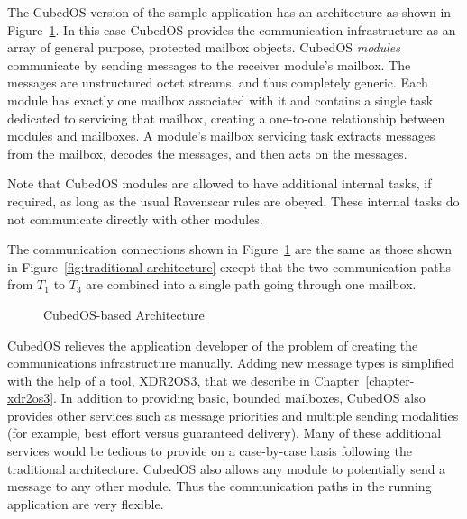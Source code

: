 The CubedOS version of the sample application has an architecture as shown in
Figure~\ref{fig:cubedos-architecture}. In this case CubedOS provides the communication
infrastructure as an array of general purpose, protected mailbox objects. CubedOS
\textit{modules} communicate by sending messages to the receiver module's mailbox. The messages
are unstructured octet streams, and thus completely generic. Each module has exactly one mailbox
associated with it and contains a single task dedicated to servicing that mailbox, creating a
one-to-one relationship between modules and mailboxes. A module's mailbox servicing task
extracts messages from the mailbox, decodes the messages, and then acts on the messages.

Note that CubedOS modules are allowed to have additional internal tasks, if required, as long as
the usual Ravenscar rules are obeyed. These internal tasks do not communicate directly with
other modules.

The communication connections shown in Figure~\ref{fig:cubedos-architecture} are the same as
those shown in Figure~\ref{fig:traditional-architecture} except that the two communication paths
from $T_1$ to $T_3$ are combined into a single path going through one mailbox.

\begin{figure}[tbhp]
  \center
  \caption{CubedOS-based Architecture}
  \label{fig:cubedos-architecture}
\end{figure}

CubedOS relieves the application developer of the problem of creating the communications
infrastructure manually. Adding new message types is simplified with the help of a tool,
XDR2OS3, that we describe in Chapter~\ref{chapter-xdr2os3}. In addition to providing
basic, bounded mailboxes, CubedOS also provides other services such as message priorities and
multiple sending modalities (for example, best effort versus guaranteed delivery). Many of these
additional services would be tedious to provide on a case-by-case basis following the
traditional architecture. CubedOS also allows any module to potentially send a message to any
other module. Thus the communication paths in the running application are very flexible.


